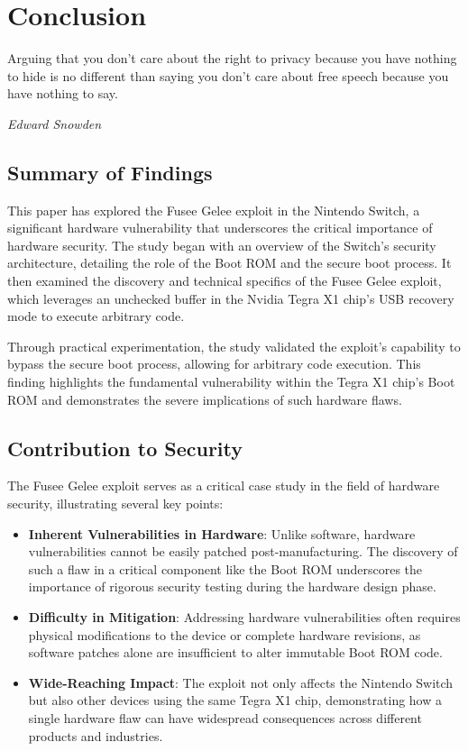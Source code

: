 \chapter{Conclusion}
\epigraph{Arguing that you don't care about the right to privacy because you have nothing to hide is no different than saying you don't care about free speech because you have nothing to say.}{\textit{Edward Snowden}}

\section{Summary of Findings}

This paper has explored the Fusee Gelee exploit in the Nintendo Switch, a significant hardware vulnerability that underscores the critical importance of hardware security. The study began with an overview of the Switch's security architecture, detailing the role of the Boot ROM and the secure boot process. It then examined the discovery and technical specifics of the Fusee Gelee exploit, which leverages an unchecked buffer in the Nvidia Tegra X1 chip's USB recovery mode to execute arbitrary code.

Through practical experimentation, the study validated the exploit's capability to bypass the secure boot process, allowing for arbitrary code execution. This finding highlights the fundamental vulnerability within the Tegra X1 chip's Boot ROM and demonstrates the severe implications of such hardware flaws.

\section{Contribution to Security}

The Fusee Gelee exploit serves as a critical case study in the field of hardware security, illustrating several key points:

\begin{itemize}
    \item \textbf{Inherent Vulnerabilities in Hardware}: Unlike software, hardware vulnerabilities cannot be easily patched post-manufacturing. The discovery of such a flaw in a critical component like the Boot ROM underscores the importance of rigorous security testing during the hardware design phase.
    \item \textbf{Difficulty in Mitigation}: Addressing hardware vulnerabilities often requires physical modifications to the device or complete hardware revisions, as software patches alone are insufficient to alter immutable Boot ROM code.
    \item \textbf{Wide-Reaching Impact}: The exploit not only affects the Nintendo Switch but also other devices using the same Tegra X1 chip, demonstrating how a single hardware flaw can have widespread consequences across different products and industries.
\end{itemize}


